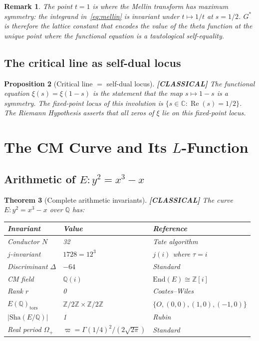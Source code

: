 \documentclass[11pt]{article}
\theoremstyle{tight}
\newtheorem{theorem}{Theorem}[section]
\newtheorem{proposition}[theorem]{Proposition}
\theoremstyle{plainroman}
\newtheorem{remark}[theorem]{Remark}
\newcommand{\C}{\mathbb{C}}
\newcommand{\Z}{\mathbb{Z}}
\newcommand{\Q}{\mathbb{Q}}
\begin{document}
\begin{remark}
The point $t=1$ is where the Mellin transform has maximum symmetry: the integrand in~\eqref{eq:mellin} is invariant under $t\mapsto 1/t$ at $s=1/2$.
$G^*$ is therefore the lattice constant that encodes the value of the theta function at the \emph{unique} point where the functional equation is a tautological self-equality.
\end{remark}

\subsection{The critical line as self-dual locus}

\begin{proposition}[Critical line $=$ self-dual locus]\label{prop:critical}
\textbf{[CLASSICAL]}
The functional equation $\xi(s)=\xi(1-s)$ is the statement that the map $s\mapsto 1-s$ is a symmetry.
The fixed-point locus of this involution is $\{s\in\C:\operatorname{Re}(s)=1/2\}$.
The Riemann Hypothesis asserts that all zeros of $\xi$ lie on this fixed-point locus.
\end{proposition}

\section{The CM Curve and Its $L$-Function}

\subsection{Arithmetic of $E:y^2=x^3-x$}

\begin{theorem}[Complete arithmetic invariants]\label{thm:arithmetic}
\textbf{[CLASSICAL]}
The curve $E:y^2=x^3-x$ over $\Q$ has:
\begin{center}
\renewcommand{\arraystretch}{1.2}
\begin{tabular}{lll}
\toprule
\textbf{Invariant} & \textbf{Value} & \textbf{Reference} \\
\midrule
Conductor $N$ & 32 & Tate algorithm \\
$j$-invariant & $1728=12^3$ & $j(i)$ where $\tau=i$ \\
Discriminant $\Delta$ & $-64$ & Standard \\
CM field & $\Q(i)$ & $\mathrm{End}(E)\cong\Z[i]$ \\
Rank $r$ & 0 & Coates--Wiles~\cite{coateswiles} \\
$E(\Q)_{\mathrm{tors}}$ & $\Z/2\Z\times\Z/2\Z$ & $\{O,(0,0),(1,0),(-1,0)\}$ \\
$|\mathrm{Sha}(E/\Q)|$ & 1 & Rubin~\cite{rubin} \\
Real period $\Omega_+$ & $\varpi=\Gamma(1/4)^2/(2\sqrt{2\pi})$ & Standard \\
\bottomrule
\end{tabular}
\end{center}
\end{theorem}
\end{document}
